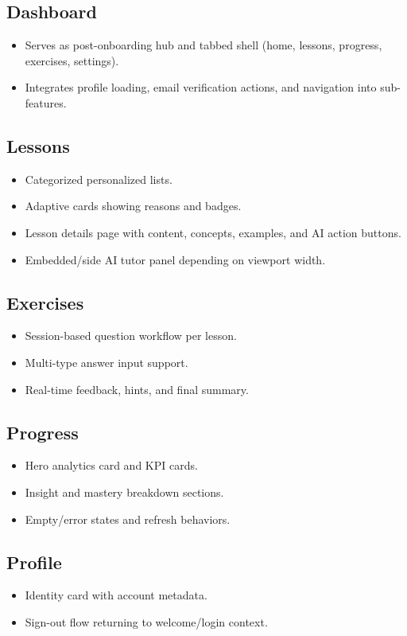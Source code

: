 \documentclass[11pt,a4paper]{article}
\begin{document}
\subsection{Dashboard}
\begin{itemize}
  \item Serves as post-onboarding hub and tabbed shell (home, lessons, progress, exercises, settings).
  \item Integrates profile loading, email verification actions, and navigation into sub-features.
\end{itemize}

\subsection{Lessons}
\begin{itemize}
  \item Categorized personalized lists.
  \item Adaptive cards showing reasons and badges.
  \item Lesson details page with content, concepts, examples, and AI action buttons.
  \item Embedded/side AI tutor panel depending on viewport width.
\end{itemize}

\subsection{Exercises}
\begin{itemize}
  \item Session-based question workflow per lesson.
  \item Multi-type answer input support.
  \item Real-time feedback, hints, and final summary.
\end{itemize}

\subsection{Progress}
\begin{itemize}
  \item Hero analytics card and KPI cards.
  \item Insight and mastery breakdown sections.
  \item Empty/error states and refresh behaviors.
\end{itemize}

\subsection{Profile}
\begin{itemize}
  \item Identity card with account metadata.
  \item Sign-out flow returning to welcome/login context.
\end{itemize}
\end{document}
